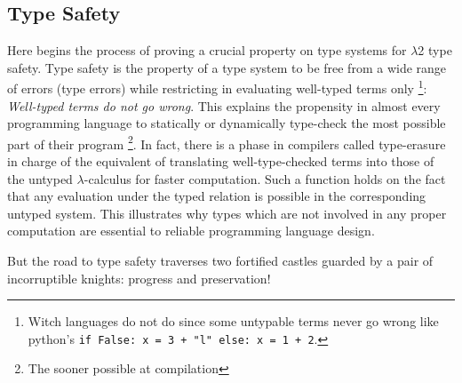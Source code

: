 \documentclass{article}
\begin{document}
    \subsection{Type Safety}
    Here begins the process of proving a crucial property on type systems for $\lambda$2 type safety. Type safety is the property of a type system to be free from a wide range of errors (type errors) while restricting in evaluating well-typed terms only
    \footnote{Witch languages do not do since some untypable terms never go wrong like python's \texttt{if False: x = 3 + "l" else: x = 1 + 2}.}: \textit{Well-typed terms do not go wrong}.
    This explains the propensity in almost every programming language to statically or dynamically type-check the most possible part of their program \footnote{The sooner possible at compilation}. In fact, there is a phase in compilers called type-erasure in charge of the equivalent of translating well-type-checked terms into those of the untyped $\lambda$-calculus for faster computation. Such a function holds on the fact that any evaluation under the typed relation is possible in the corresponding untyped system. This illustrates why types which are not involved in any proper computation are essential to reliable programming language design.\par
    But the road to type safety traverses two fortified castles guarded by a pair of incorruptible knights: progress and preservation!
\end{document}
